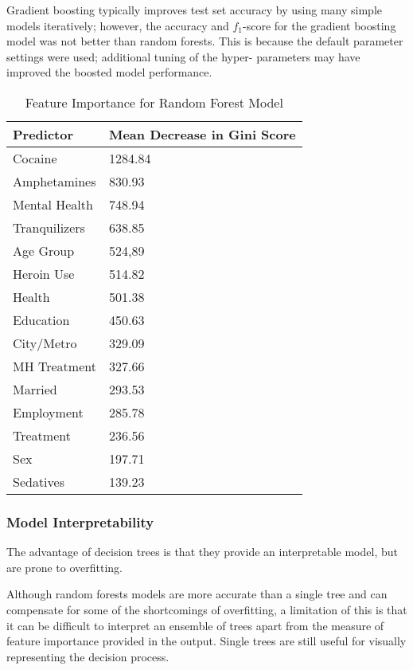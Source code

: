 \documentclass[sigconf]{acmart}
\begin{document}
Gradient boosting typically improves test set accuracy by using many simple
models iteratively; however, the accuracy and $f_1$-score for the gradient 
boosting model was not better than random forests. This is because the 
default parameter settings were used; additional tuning of the hyper-
parameters may have improved the boosted model performance.


\begin{table}
  \caption{Feature Importance for Random Forest Model}
  \label{tab:freq}
  \begin{tabular}{ll}
    \toprule
    Predictor&  Mean Decrease in Gini Score  \\    
    \midrule
    Cocaine       & 1284.84 \\
    Amphetamines  &  830.93 \\
    Mental Health &  748.94 \\ 
    Tranquilizers &  638.85 \\
    Age Group     &  524,89 \\
    Heroin Use    &  514.82 \\
    Health        &  501.38 \\
    Education     &  450.63 \\
    City/Metro    &  329.09 \\
    MH Treatment  &  327.66 \\
    Married       &  293.53 \\
    Employment    &  285.78 \\ 
    Treatment     &  236.56 \\
    Sex           &  197.71 \\
    Sedatives   &  139.23 \\
    \bottomrule
  \end{tabular}
\end{table}


\subsubsection{Model Interpretability}


The advantage of decision trees is that they provide an interpretable model,
but are prone to overfitting. 

Although random forests models are more accurate than a single tree and can
compensate for some of the shortcomings of overfitting, a limitation of this 
is that it can be difficult to interpret an ensemble of trees apart from the 
measure of feature importance provided in the output. Single trees are still 
useful for visually representing the decision process.
\end{document}
